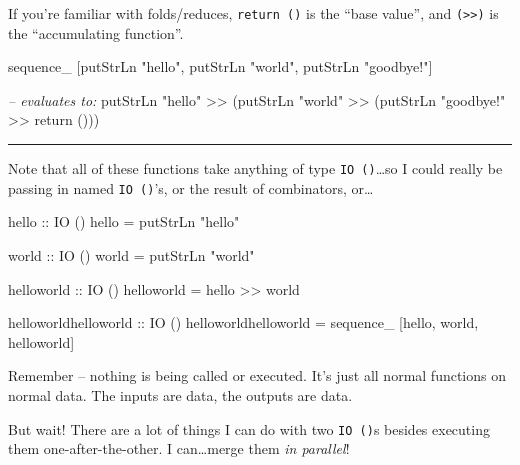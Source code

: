 \documentclass[]{article}
\newenvironment{Shaded}{}{}
\newcommand{\CommentTok}[1]{\textcolor[rgb]{0.38,0.63,0.69}{\textit{#1}}}
\newcommand{\DataTypeTok}[1]{\textcolor[rgb]{0.56,0.13,0.00}{#1}}
\newcommand{\FunctionTok}[1]{\textcolor[rgb]{0.02,0.16,0.49}{#1}}
\newcommand{\NormalTok}[1]{#1}
\newcommand{\OtherTok}[1]{\textcolor[rgb]{0.00,0.44,0.13}{#1}}
\newcommand{\StringTok}[1]{\textcolor[rgb]{0.25,0.44,0.63}{#1}}
\begin{document}
If you're familiar with folds/reduces, \texttt{return\ ()} is the ``base
value'', and \texttt{(\textgreater{}\textgreater{})} is the ``accumulating
function''.

\begin{Shaded}
\begin{Highlighting}[]
\NormalTok{sequence_ [putStrLn }\StringTok{"hello"}\NormalTok{, putStrLn }\StringTok{"world"}\NormalTok{, putStrLn }\StringTok{"goodbye!"}\NormalTok{]}

\CommentTok{-- evaluates to:}
\NormalTok{putStrLn }\StringTok{"hello"} \FunctionTok{>>}\NormalTok{ (putStrLn }\StringTok{"world"} \FunctionTok{>>}\NormalTok{ (putStrLn }\StringTok{"goodbye!"} \FunctionTok{>>}\NormalTok{ return ()))}
\end{Highlighting}
\end{Shaded}

\begin{center}\rule{0.5\linewidth}{\linethickness}\end{center}

Note that all of these functions take anything of type \texttt{IO\ ()}\ldots{}so
I could really be passing in named \texttt{IO\ ()}'s, or the result of
combinators, or\ldots{}

\begin{Shaded}
\begin{Highlighting}[]
\OtherTok{hello ::} \DataTypeTok{IO}\NormalTok{ ()}
\NormalTok{hello }\FunctionTok{=}\NormalTok{ putStrLn }\StringTok{"hello"}

\OtherTok{world ::} \DataTypeTok{IO}\NormalTok{ ()}
\NormalTok{world }\FunctionTok{=}\NormalTok{ putStrLn }\StringTok{"world"}

\OtherTok{helloworld ::} \DataTypeTok{IO}\NormalTok{ ()}
\NormalTok{helloworld }\FunctionTok{=}\NormalTok{ hello }\FunctionTok{>>}\NormalTok{ world}

\OtherTok{helloworldhelloworld ::} \DataTypeTok{IO}\NormalTok{ ()}
\NormalTok{helloworldhelloworld }\FunctionTok{=}\NormalTok{ sequence_ [hello, world, helloworld]}
\end{Highlighting}
\end{Shaded}

Remember -- nothing is being called or executed. It's just all normal functions
on normal data. The inputs are data, the outputs are data.

But wait! There are a lot of things I can do with two \texttt{IO\ ()}s besides
executing them one-after-the-other. I can\ldots{}merge them \emph{in parallel}!
\end{document}
